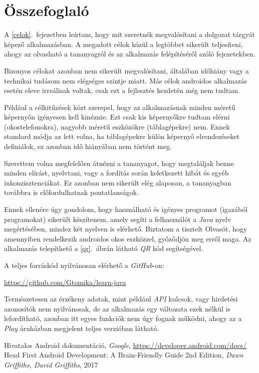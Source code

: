 \documentclass[12pt,a4paper]{article}
\begin{document}
	\section{Összefoglaló}\label{osszefoglalo}
	
	A \ref{celok}.\ fejezetben leírtam, hogy mit szeretnék megvalósítani a dolgozat tárgyát képező alkalmazásban. A megadott célok közül a legtöbbet sikerült teljesíteni, ahogy az olvasható a tananyagról és az alkalmazás felépítéséről szóló fejezetekben.
	
	Bizonyos célokat azonban nem sikerült megvalósítani, általában időhiány vagy a technikai tudásom nem elégséges szintje miatt. Más célok androidos alkalmazás esetén eleve irreálisak voltak, csak ezt a fejlesztés kezdetén még nem tudtam.
	
	Például a célkitűzések közt szerepel, hogy az alkalmazásnak minden méretű képernyőn igényesen kell kinéznie. Ezt csak kis képernyőkre tudtam elérni (okostelefonokra), nagyobb méretű eszközökre (táblagépekre) nem. Ennek standard módja az lett volna, ha táblagépekre külön képernyő elrendezéseket definiálok, ez azonban idő hiányában nem történt meg.
	
	Szerettem volna megfelelően átnézni a tananyagot, hogy megtaláljak benne minden elírást, nyelvtani, vagy a fordítás során keletkezett hibát és egyéb inkonzisztenciákat. Ez azonban nem sikerült elég alaposan, a tananyagban továbbra is előfordulhatnak pontatlanságok.
	
	Ennek ellenére úgy gondolom, hogy használható és igényes programot (igazából programokat) sikerült készítenem, amely segíti a felhasználót a \textit{Java} nyelv megértésében, mindez két nyelven is elérhető. Biztatom a tisztelt Olvasót, hogy amennyiben rendelkezik androidos okos eszközzel, győződjön meg erről maga. Az alkalmazás telepíthető a \ref{qr}.\ ábrán látható \textit{QR} kód segítségével.  
	
	A teljes forráskód nyilvánosan elérhető a \textit{GitHub}-on:
	
	\begin{center}
	 	\url{https://github.com/Gtomika/learn-java}
	\end{center}

	Természetesen az érzékeny adatok, mint például \textit{API} kulcsok, vagy hirdetési azonosítók nem nyilvánosak, de az alkalmazás egy változata ezek nélkül is lefordítható, azonban itt egyes funkciók nem úgy fognak működni, ahogy az a \textit{Play} áruházban megjelent teljes verzióban látható.
	
	\renewcommand\refname{Használt segédanyagok}
	\begin{thebibliography}{9}
		Hivatalos Android dokumentáció, \textit{Google}, \url{https://developer.android.com/docs/}
		Head First Android Development: A Brain-Friendly Guide 2nd Edition, \textit{Dawn Griffiths, David Griffiths}, 2017
	\end{thebibliography}
	
\end{document}

